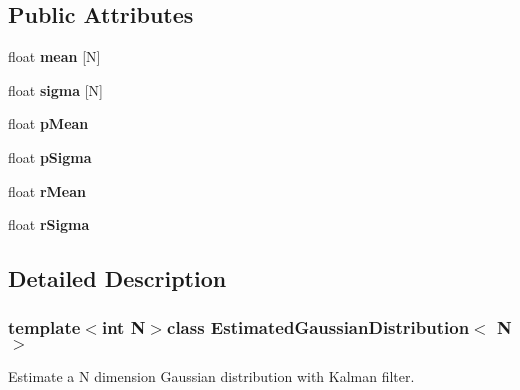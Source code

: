 \subsection*{Public Attributes}
\begin{DoxyCompactItemize}
\item 
\hypertarget{classEstimatedGaussianDistribution_a0ce3513e3ecbe1882a3a1d6aa4aeb10f}{}float {\bfseries mean} \mbox{[}N\mbox{]}\label{classEstimatedGaussianDistribution_a0ce3513e3ecbe1882a3a1d6aa4aeb10f}

\item 
\hypertarget{classEstimatedGaussianDistribution_af8e85818690b3d1dc18ef467cb5fcc01}{}float {\bfseries sigma} \mbox{[}N\mbox{]}\label{classEstimatedGaussianDistribution_af8e85818690b3d1dc18ef467cb5fcc01}

\item 
\hypertarget{classEstimatedGaussianDistribution_a5240d7947f5f386125209bf9b4a04712}{}float {\bfseries p\+Mean}\label{classEstimatedGaussianDistribution_a5240d7947f5f386125209bf9b4a04712}

\item 
\hypertarget{classEstimatedGaussianDistribution_a5f59468f2b623f2072977cdfc91c86a5}{}float {\bfseries p\+Sigma}\label{classEstimatedGaussianDistribution_a5f59468f2b623f2072977cdfc91c86a5}

\item 
\hypertarget{classEstimatedGaussianDistribution_ae2cdb30a07eced903acd22fd8cf93ca5}{}float {\bfseries r\+Mean}\label{classEstimatedGaussianDistribution_ae2cdb30a07eced903acd22fd8cf93ca5}

\item 
\hypertarget{classEstimatedGaussianDistribution_af8400eefcec90df5ce67f95c9c3f25fd}{}float {\bfseries r\+Sigma}\label{classEstimatedGaussianDistribution_af8400eefcec90df5ce67f95c9c3f25fd}

\end{DoxyCompactItemize}


\subsection{Detailed Description}
\subsubsection*{template$<$int N$>$class Estimated\+Gaussian\+Distribution$<$ N $>$}

Estimate a N dimension Gaussian distribution with Kalman filter. 

